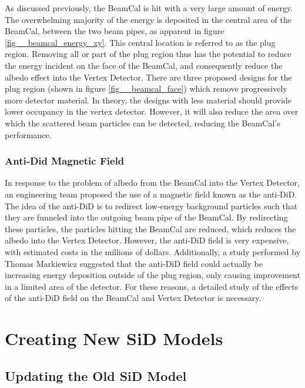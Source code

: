 \documentclass{report}
\begin{document}
                As discussed previously, the BeamCal is hit with a very large amount of energy. The overwhelming majority of the energy is deposited in the central area of the BeamCal, between the two beam pipes, as apparent in figure \ref{fig__beamcal_energy_xy}. This central location is referred to as the plug region. Removing all or part of the plug region thus has the potential to reduce the energy incident on the face of the BeamCal, and consequently reduce the albedo effect into the Vertex Detector. There are three proposed designs for the plug region (shown in figure \ref{fig__beamcal_face}) which remove progressively more detector material. In theory, the designs with less material should provide lower occupancy in the vertex detector. However, it will also reduce the area over which the scattered beam particles can be detected, reducing the BeamCal's performance.


            \subsection{Anti-Did Magnetic Field}
                In response to the problem of albedo from the BeamCal into the Vertex Detector, an engineering team proposed the use of a magnetic field known as the anti-DiD. The idea of the anti-DiD is to redirect low-energy background particles such that they are funneled into the outgoing beam pipe of the BeamCal. By redirecting these particles, the particles hitting the BeamCal are reduced, which reduces the albedo into the Vertex Detector. However, the anti-DiD field is very expensive, with estimated costs in the millions of dollars. Additionally, a study performed by Thomas Markiewicz \cite{anti-did} suggested that the anti-DiD field could actually be increasing energy deposition outside of the plug region, only causing improvement in a limited area of the detector. For these reasons, a detailed study of the effects of the anti-DiD field on the BeamCal and Vertex Detector is necessary.





    \chapter{Creating New SiD Models}
        \section{Updating the Old SiD Model}
            
\end{document}
